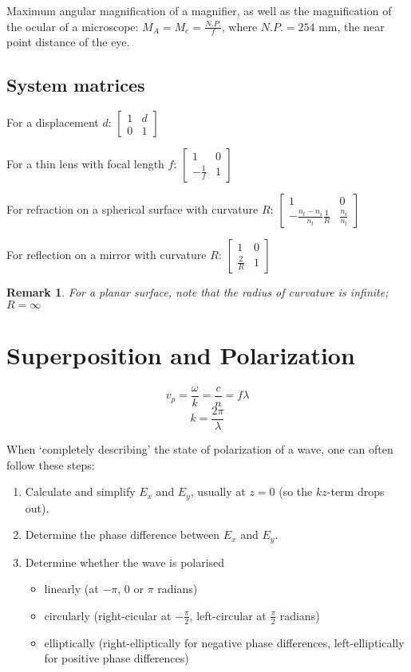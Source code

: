 \documentclass{article}
\newtheorem*{remark}{Remark}
\begin{document}
\noindent{}Maximum angular magnification of a magnifier, as well as the magnification of the ocular of a microscope:
$M_A=M_e=\frac{N.P.}{f}$, where $N.P.=254$ \si{\milli\metre}, the near point distance of the eye.

\subsection{System matrices}

\noindent{}For a displacement $d$:
$
\begin{bmatrix}
1 & d\\
0 & 1
\end{bmatrix}
$

\noindent{}For a thin lens with focal length $f$:
$
\begin{bmatrix}
1 & 0\\
-\frac{1}{f} & 1
\end{bmatrix}
$

\noindent{}For refraction on a spherical surface with curvature $R$:
$
\begin{bmatrix}
1 & 0\\
-\frac{n_t-n_i}{n_t}\frac{1}{R} & \frac{n_i}{n_t}
\end{bmatrix}
$

\noindent{}For reflection on a mirror with curvature $R$:
$
\begin{bmatrix}
1 & 0\\
\frac{2}{R} & 1
\end{bmatrix}
$

\begin{remark}
For a planar surface, note that the radius of curvature is infinite; $R=\infty$
\end{remark}

\section{Superposition and Polarization}
$$v_p=\frac{\omega}{k}=\frac{c}{n}=f\lambda$$
$$k=\frac{2\pi}{\lambda}$$

\noindent{}When `completely describing' the state of polarization of a wave, one can often follow these steps:
\begin{enumerate}
\item Calculate and simplify $E_x$ and $E_y$, usually at $z=0$ (so the $kz$-term drops out).
\item Determine the phase difference between $E_x$ and $E_y$.
\item Determine whether the wave is polarised
\begin{itemize}
\item linearly (at $-\pi$, $0$ or $\pi$ radians)
\item circularly (right-cicular at $-\frac{\pi}{2}$, left-circular at $\frac{\pi}{2}$ radians)
\item elliptically (right-elliptically for negative phase differences, left-elliptically for positive phase differences)
\end{itemize}
\end{enumerate}
\end{document}
